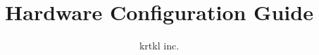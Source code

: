 
%
%
\title{Hardware Configuration Guide}
\author{krtkl inc.}

\makeatletter




	\maketitle

	
	
	
		


